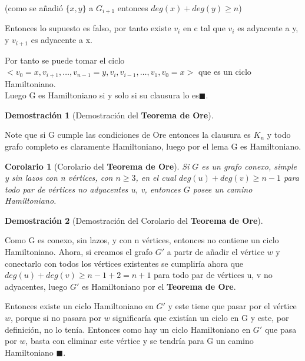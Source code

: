 \documentclass[a4paper,1pt]{report}
\newtheorem*{cor}{Corolario}
\newtheorem*{dem}{Demostración}
\begin{document}
(como se añadió $\{x,y\}$  a $G_{i+1}$ entonces $deg(x)+deg(y)\geq n$)

Entonces lo supuesto es falso, por tanto existe $v_i$ en c tal que $v_i$ es adyacente a y, y $v_{i+1}$ es adyacente a x. 

Por tanto se puede tomar el ciclo $<v_0=x,v_{i+1},\dots,v_{n-1}=y,v_i,v_{i-1},\dots,v_1,v_0=x>$ que es un ciclo Hamiltoniano.\\

Luego G es Hamiltoniano si y solo si su clausura lo es$\blacksquare$.

\begin{dem}[Demostración del \textbf{Teorema de Ore}]
 
\end{dem}

Note que si G cumple las condiciones de Ore entonces la clausura es $K_n$ y todo grafo completo es claramente Hamiltoniano, luego por el lema G es Hamiltoniano.
  
\begin{cor}[Corolario del \textbf{Teorema de Ore}]
  Si $G$ es un grafo conexo, simple y sin lazos con n vértices, con $n\geq 3$, en el cual $deg(u)+deg(v)\geq n - 1$ para todo par de vértices no adyacentes u, v, entonces $G$ posee un camino Hamiltoniano.
\end{cor}

\begin{dem}[Demostración del Corolario del \textbf{Teorema de Ore}]
 
\end{dem}

Como G es conexo, sin lazos, y con n vértices, entonces no contiene un ciclo Hamiltoniano. Ahora, si creamos el grafo $G'$ a partr de añadir el vértice $w$ y conectarlo con todos los vértices existentes se cumpliría ahora  que\\ $deg(u)+deg(v)\geq n - 1 + 2 = n + 1$ para todo par de vértices u, v no adyacentes,
luego $G'$ es Hamiltoniano por el \textbf{Teorema de Ore}.

Entonces existe un ciclo Hamiltoniano en $G'$ y este tiene que pasar por el vértice $w$, porque si no pasara por $w$ significaría que existían un ciclo en G y este, por definición, no lo tenía. Entonces como hay un ciclo Hamiltoniano en $G'$ que pasa por $w$, basta con eliminar este vértice y se tendría para G un camino Hamiltoniano $\blacksquare$.
\end{document}
